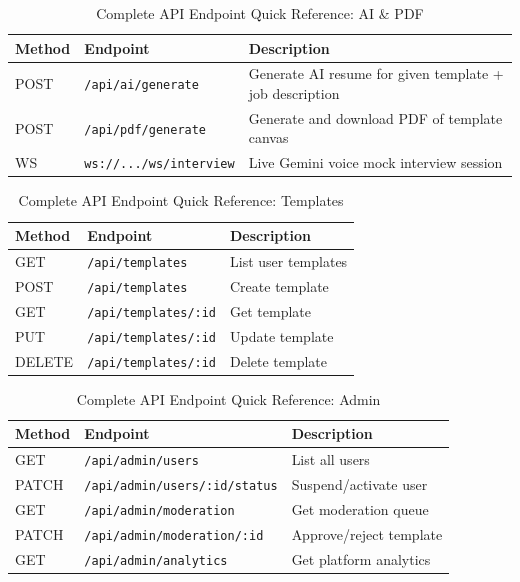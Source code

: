 \documentclass[12pt, a4paper, oneside]{report}
\begin{document}
\begin{table}[H]
\centering
\caption{Complete API Endpoint Quick Reference: AI \& PDF}
\label{tab:api_full_reference_ai_pdf}
\renewcommand{\arraystretch}{1.3}
\begin{tabularx}{\textwidth}{|p{2cm}|p{6cm}|X|}
\hline
\textbf{Method} & \textbf{Endpoint} & \textbf{Description} \\
\hline
POST   & \texttt{/api/ai/generate} & Generate AI resume \cite{gemini2023} for given template + job description \\
POST   & \texttt{/api/pdf/generate} & Generate and download PDF \cite{puppeteer2024} of template canvas \\
WS     & \texttt{ws://.../ws/interview} & Live Gemini voice \cite{geminidocs2024} mock interview session \\
\hline
\end{tabularx}
\end{table}

\begin{table}[H]
\centering
\caption{Complete API Endpoint Quick Reference: Templates}
\label{tab:api_full_reference_templates}
\renewcommand{\arraystretch}{1.3}
\begin{tabularx}{\textwidth}{|p{2cm}|p{5cm}|X|}
\hline
\textbf{Method} & \textbf{Endpoint} & \textbf{Description} \\
\hline
GET    & \texttt{/api/templates} & List user templates \\
POST   & \texttt{/api/templates} & Create template \\
GET    & \texttt{/api/templates/:id} & Get template \\
PUT    & \texttt{/api/templates/:id} & Update template \\
DELETE & \texttt{/api/templates/:id} & Delete template \\
\hline
\end{tabularx}
\end{table}

\begin{table}[H]
\centering
\caption{Complete API Endpoint Quick Reference: Admin}
\label{tab:api_full_reference_admin}
\renewcommand{\arraystretch}{1.3}
\begin{tabularx}{\textwidth}{|p{2cm}|p{7cm}|X|}
\hline
\textbf{Method} & \textbf{Endpoint} & \textbf{Description} \\
\hline
GET    & \texttt{/api/admin/users} & List all users \\
PATCH  & \texttt{/api/admin/users/:id/status} & Suspend/activate user \\
GET    & \texttt{/api/admin/moderation} & Get moderation queue \\
PATCH  & \texttt{/api/admin/moderation/:id} & Approve/reject template \\
GET    & \texttt{/api/admin/analytics} & Get platform analytics \\
\hline
\end{tabularx}
\end{table}
\end{document}
